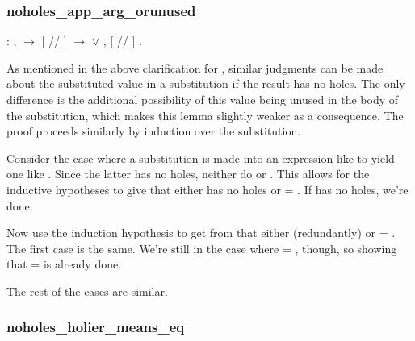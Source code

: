 \documentclass[12pt]{report}
\begin{document}
\subsubsection{noholes\_app\_arg\_orunused}

\begin{coqdoccode}
\coqdocemptyline
\coqdocindent{1.00em}
  : \coqdockw{\ensuremath{\forall}}    ,\coqdoceol
\coqdocindent{1.00em}
  \ensuremath{\rightarrow}\coqdoceol
\coqdocindent{1.00em}
[ // ]    \ensuremath{\rightarrow}\coqdoceol
\coqdocindent{1.00em}
  \ensuremath{\lor} \coqdockw{\ensuremath{\forall}} , [ // ]   .\coqdoceol
\coqdocemptyline
\end{coqdoccode}

As mentioned in the above clarification for ,
similar judgments can be made about the substituted value in
a substitution if the result has no holes. The only difference is the
additional possibility of this value being unused in the body of the
substitution, which makes this lemma slightly weaker as
a consequence. The proof proceeds similarly by induction over the
substitution. 

Consider the case where a substitution is made into an expression
like    to yield one
like   . Since the
latter has no holes, neither do  or
. This allows for the inductive hypotheses to give
that either  has no holes or 
= . If  has no holes, we're done.


Now use the induction hypothesis to get from 
 that either (redundantly) 
 or  = . The first case
is the same. We're still in the case where 
= , though, so showing that 
  =  
 is already done.


The rest of the cases are similar. 

\subsubsection{noholes\_holier\_means\_eq}
\end{document}
